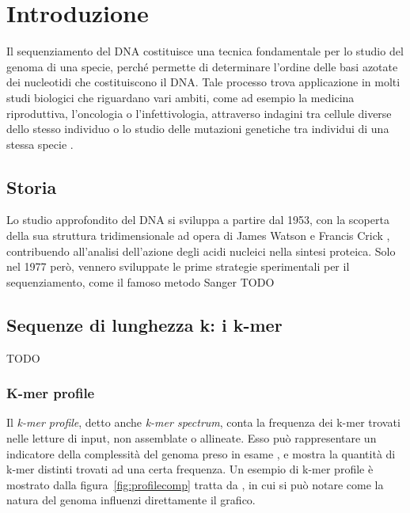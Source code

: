 \documentclass[crop=false, class=book]{standalone}
\begin{document}
	\chapter{Introduzione}
	
	Il sequenziamento del DNA costituisce una tecnica fondamentale per lo studio del genoma di una specie, perché permette di determinare l'ordine delle basi azotate dei nucleotidi che costituiscono il DNA. Tale processo trova applicazione in molti studi biologici che riguardano vari ambiti, come ad esempio la medicina riproduttiva, l'oncologia o l'infettivologia, attraverso indagini tra cellule diverse dello stesso individuo o lo studio delle mutazioni genetiche tra individui di una stessa specie \cite{shendure2012expanding}. 
	
	
	\section{Storia}
	Lo studio approfondito del DNA si sviluppa a partire dal 1953, con la scoperta della sua struttura tridimensionale ad opera di James Watson e Francis Crick \cite{watson1953molecular}, contribuendo all'analisi dell'azione degli acidi nucleici nella sintesi proteica. Solo nel 1977 però, vennero sviluppate le prime strategie sperimentali per il sequenziamento, come il famoso metodo Sanger \cite{sanger1977DNA, sanger1977nucleotide} TODO
	
	
	\section{Sequenze di lunghezza k: i k-mer}
		TODO
		
	\subsection{K-mer profile}
	\label{subsec:kmerprofile}
	Il \textit{k-mer profile}, detto anche \textit{k-mer spectrum}, conta la frequenza dei k-mer trovati nelle letture di input, non assemblate o allineate. Esso può rappresentare un indicatore della complessità del genoma preso in esame \cite{vurture2017genomescope}, e mostra la quantità di k-mer distinti trovati ad una certa frequenza. Un esempio di k-mer profile è mostrato dalla figura~\vref{fig:profilecomp} tratta da \cite{sohn2016present}, in cui si può notare come la natura del genoma influenzi direttamente il grafico. 
\end{document}
